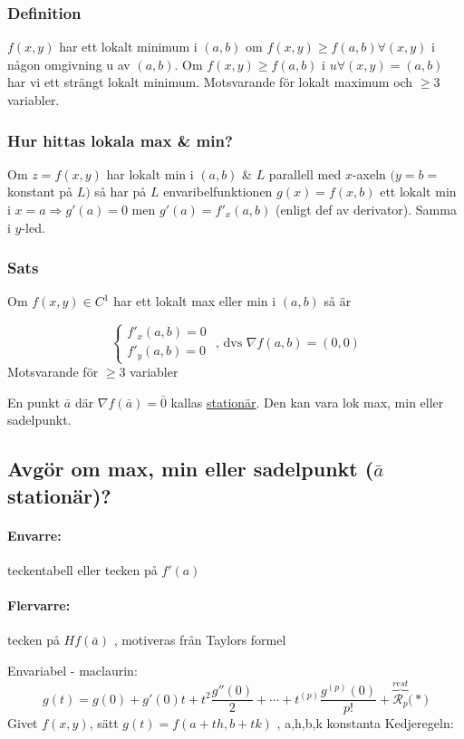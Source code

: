 \documentclass[a4paper]{article}
\begin{document}
\subsubsection{Definition}
\(f(x,y)\) har ett lokalt minimum i \((a,b)\) om \(f(x,y) \geq f(a,b) \forall (x,y)\) i någon omgivning u av \((a,b)\). Om \(f(x,y) \geq f(a,b)\) i \(u \forall (x,y) = (a,b)\) har vi ett strängt lokalt minimum.
Motsvarande för lokalt maximum och \(\geq 3\) variabler.

\subsubsection{Hur hittas lokala max \& min?}
Om \(z=f(x,y)\) har lokalt min i \((a,b)\) \& \(L\) parallell med \(x\)-axeln \(\big(y=b=\)konstant på \(L \big)\) så har på \(L\) envaribelfunktionen \(g(x) = f(x,b)\) ett lokalt min i \(x=a \Rightarrow g'(a) = 0\) men
\(g'(a) = f'_x(a,b)\) \big(enligt def av derivator\big). Samma i \(y\)-led.

\subsubsection{Sats}
Om \(f(x,y) \in C^1\) har ett lokalt max eller min i \((a,b)\) så är

$$
\left\{\begin{array}{rcl}
	f'_x(a,b) = 0 \\
	f'_y(a,b) = 0
\end{array}\right.
\text{ , dvs }\nabla f(a,b) = (0,0)
$$
Motsvarande för $\geq 3$ variabler

En punkt $\bar{a}$ där $\nabla f(\bar{a}) = \bar{0}$ kallas \underline{stationär}. Den kan vara lok max, min eller sadelpunkt.

\newpage
\subsection{Avgör om max, min eller sadelpunkt (\texorpdfstring{$\bar{a}$}{a} stationär)?} \label{sec:Hessian}
\paragraph{Envarre:} teckentabell eller tecken på $f'(a)$
\paragraph{Flervarre:} tecken på $H f(\bar{a})$ , motiveras från Taylors formel

Envariabel - maclaurin:
\begin{equation}\label{eq:6.1}
	g(t) = g(0) + g'(0)t + t^2\frac{g''(0)}{2} + \cdots + t^{(p)}\frac{g^{(p)}(0)}{p!} + \overbrace{\mathcal{R}_p}^{rest} \Big(*\Big)
\end{equation}
Givet $f(x,y)$, sätt $g(t) = f(a+th,b+tk)$ ,  a,h,b,k konstanta \newline
Kedjeregeln:
\end{document}
